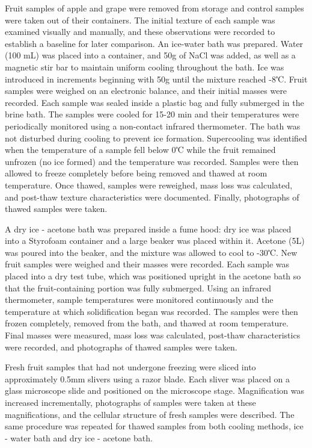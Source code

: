 Fruit samples of apple and grape were removed from storage and control
samples were taken out of their containers. The initial texture of each
sample was examined visually and manually, and these observations were
recorded to establish a baseline for later comparison. An ice-water bath
was prepared. Water (100 mL) was placed into a container, and 50g of
NaCl was added, as well as a magnetic stir bar to maintain uniform
cooling throughout the bath. Ice was introduced in increments beginning
with 50g until the mixture reached -8℃. Fruit samples were weighed on an
electronic balance, and their initial masses were recorded. Each sample
was sealed inside a plastic bag and fully submerged in the brine bath.
The samples were cooled for 15-20 min and their temperatures were
periodically monitored using a non-contact infrared thermometer. The
bath was not disturbed during cooling to prevent ice formation.
Supercooling was identified when the temperature of a sample fell below
0℃ while the fruit remained unfrozen (no ice formed) and the temperature
was recorded. Samples were then allowed to freeze completely before
being removed and thawed at room temperature. Once thawed, samples were
reweighed, mass loss was calculated, and post-thaw texture
characteristics were documented. Finally, photographs of thawed samples
were taken.

A dry ice - acetone bath was prepared inside a fume hood: dry ice was
placed into a Styrofoam container and a large beaker was placed within
it. Acetone (5L) was poured into the beaker, and the mixture was allowed
to cool to -30℃. New fruit samples were weighed and their masses were
recorded. Each sample was placed into a dry test tube, which was
positioned upright in the acetone bath so that the fruit-containing
portion was fully submerged. Using an infrared thermometer, sample
temperatures were monitored continuously and the temperature at which
solidification began was recorded. The samples were then frozen
completely, removed from the bath, and thawed at room temperature. Final
masses were measured, mass loss was calculated, post-thaw
characteristics were recorded, and photographs of thawed samples were
taken.

Fresh fruit samples that had not undergone freezing were sliced into
approximately 0.5mm slivers using a razor blade. Each sliver was placed
on a glass microscope slide and positioned on the microscope stage.
Magnification was increased incrementally, photographs of samples were
taken at these magnifications, and the cellular structure of fresh
samples were described. The same procedure was repeated for thawed
samples from both cooling methods, ice - water bath and dry ice -
acetone bath.

